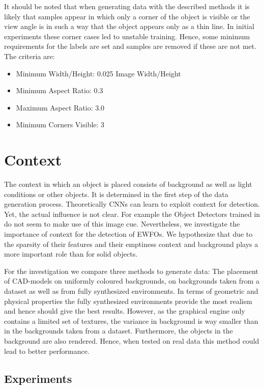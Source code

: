 It should be noted that when generating data with the described methods it is likely that samples appear in which only a corner of the object is visible or the view angle is in such a way that the object appears only as a thin line. In initial experiments these corner cases led to unstable training. Hence, some minimum requirements for the labels are set and samples are removed if these are not met. The criteria are:

\begin{itemize}
	\item Minimum Width/Height: 0.025 Image Width/Height
	\item Minimum Aspect Ratio: 0.3
	\item Maximum Aspect Ratio: 3.0
	\item Minimum Corners Visible: 3
\end{itemize}

\section{Context}

The context in which an object is placed consists of background as well as light conditions or other objects. It is determined in the first step of the data generation process. Theoretically \acp{CNN} can learn to exploit context for detection. Yet, the actual influence is not clear. For example the Object Detectors trained in \cite{Peng} do not seem to make use of this image cue. Nevertheless, we investigate the importance of context for the detection of \acp{EWFO}. We hypothesize that due to the sparsity of their features and their emptiness context and background plays a more important role than for solid objects.

For the investigation we compare three methods to generate data: The placement of \ac{CAD}-models on uniformly coloured backgrounds, on backgrounds taken from a dataset as well as from fully synthesized environments. In terms of geometric and physical properties the fully synthesized environments provide the most realism and hence should give the best results. However, as the graphical engine only contains a limited set of textures, the variance in background is way smaller than in the backgrounds taken from a dataset. Furthermore, the objects in the background are also rendered. Hence, when tested on real data this method could lead to better performance.

\subsection{Experiments}

